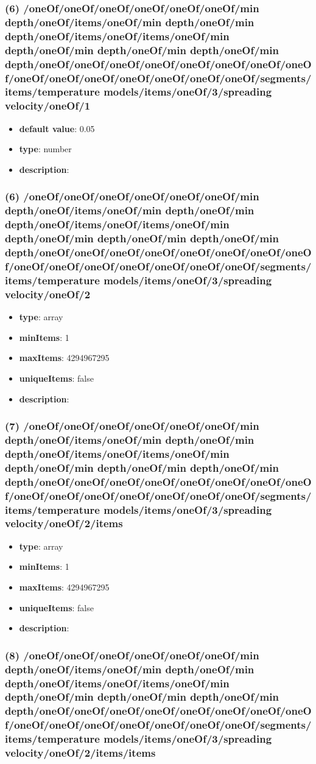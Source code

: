 \subsubsection{(6) /oneOf/oneOf/oneOf/oneOf/oneOf/oneOf/min depth/oneOf/items/oneOf/min depth/oneOf/min depth/oneOf/items/oneOf/items/oneOf/min depth/oneOf/min depth/oneOf/min depth/oneOf/min depth/oneOf/oneOf/oneOf/oneOf/oneOf/oneOf/oneOf/oneOf/oneOf/oneOf/oneOf/oneOf/oneOf/oneOf/oneOf/segments/items/temperature models/items/oneOf/3/spreading velocity/oneOf/1}
\begin{itemize}[leftmargin=6em]\item {\bf default value}: 0.05
\item {\bf type}: number
\item {\bf description}: 
\end{itemize}\subsubsection{(6) /oneOf/oneOf/oneOf/oneOf/oneOf/oneOf/min depth/oneOf/items/oneOf/min depth/oneOf/min depth/oneOf/items/oneOf/items/oneOf/min depth/oneOf/min depth/oneOf/min depth/oneOf/min depth/oneOf/oneOf/oneOf/oneOf/oneOf/oneOf/oneOf/oneOf/oneOf/oneOf/oneOf/oneOf/oneOf/oneOf/oneOf/segments/items/temperature models/items/oneOf/3/spreading velocity/oneOf/2}
\begin{itemize}[leftmargin=6em]\item {\bf type}: array
\item {\bf minItems}: 1
\item {\bf maxItems}: 4294967295
\item {\bf uniqueItems}: false
\item {\bf description}: 
\end{itemize}\subsubsection{(7) /oneOf/oneOf/oneOf/oneOf/oneOf/oneOf/min depth/oneOf/items/oneOf/min depth/oneOf/min depth/oneOf/items/oneOf/items/oneOf/min depth/oneOf/min depth/oneOf/min depth/oneOf/min depth/oneOf/oneOf/oneOf/oneOf/oneOf/oneOf/oneOf/oneOf/oneOf/oneOf/oneOf/oneOf/oneOf/oneOf/oneOf/segments/items/temperature models/items/oneOf/3/spreading velocity/oneOf/2/items}
\begin{itemize}[leftmargin=7em]\item {\bf type}: array
\item {\bf minItems}: 1
\item {\bf maxItems}: 4294967295
\item {\bf uniqueItems}: false
\item {\bf description}: 
\end{itemize}\subsubsection{(8) /oneOf/oneOf/oneOf/oneOf/oneOf/oneOf/min depth/oneOf/items/oneOf/min depth/oneOf/min depth/oneOf/items/oneOf/items/oneOf/min depth/oneOf/min depth/oneOf/min depth/oneOf/min depth/oneOf/oneOf/oneOf/oneOf/oneOf/oneOf/oneOf/oneOf/oneOf/oneOf/oneOf/oneOf/oneOf/oneOf/oneOf/segments/items/temperature models/items/oneOf/3/spreading velocity/oneOf/2/items/items}
